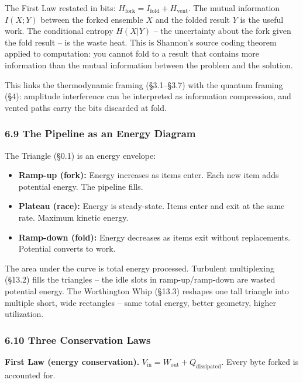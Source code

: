 \documentclass[
  11pt,
]{article}
\begin{document}
The First Law restated in bits:
\(H_{\text{fork}} = I_{\text{fold}} + H_{\text{vent}}\). The mutual
information \(I(X;Y)\) between the forked ensemble \(X\) and the folded
result \(Y\) is the useful work. The conditional entropy \(H(X|Y)\) --
the uncertainty about the fork given the fold result -- is the waste
heat. This is Shannon's source coding theorem applied to computation:
you cannot fold to a result that contains more information than the
mutual information between the problem and the solution.

This links the thermodynamic framing (§3.1--§3.7) with the quantum
framing (§4): amplitude interference can be interpreted as information
compression, and vented paths carry the bits discarded at fold.

\subsubsection{6.9 The Pipeline as an Energy
Diagram}\label{the-pipeline-as-an-energy-diagram}

The Triangle (§0.1) is an energy envelope:

\begin{itemize}
\item
  \textbf{Ramp-up (fork):} Energy increases as items enter. Each new
  item adds potential energy. The pipeline fills.
\item
  \textbf{Plateau (race):} Energy is steady-state. Items enter and exit
  at the same rate. Maximum kinetic energy.
\item
  \textbf{Ramp-down (fold):} Energy decreases as items exit without
  replacements. Potential converts to work.
\end{itemize}

The area under the curve is total energy processed. Turbulent
multiplexing (§13.2) fills the triangles -- the idle slots in
ramp-up/ramp-down are wasted potential energy. The Worthington Whip
(§13.3) reshapes one tall triangle into multiple short, wide rectangles
-- same total energy, better geometry, higher utilization.

\subsubsection{6.10 Three Conservation
Laws}\label{three-conservation-laws}

\textbf{First Law (energy conservation).}
\(V_{\text{in}} = W_{\text{out}} + Q_{\text{dissipated}}\). Every byte
forked is accounted for.
\end{document}

